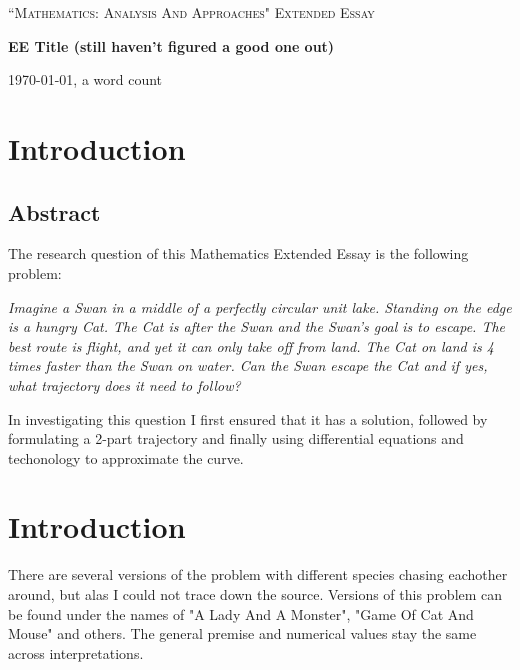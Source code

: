 \documentclass[12pt]{article}
\begin{document}
\begin{titlepage}
	\centering
	\vspace{1cm}
	{\Large \textsc{``Mathematics: Analysis And Approaches" Extended Essay}\par}
	\vspace{1.5cm}
	{\huge\bfseries EE Title (still haven't figured a good one out)\par}
	\vspace{2cm}
	\vfill
	\vfill
	{\large \today, a word count\par}
\end{titlepage}

\clearpage
{}
\tableofcontents
\newpage


\section{Introduction}
\subsection{Abstract}
The research question of this Mathematics Extended Essay is the following problem:

\emph{Imagine a Swan in a middle of a perfectly circular unit lake. Standing on the edge is a hungry Cat. The Cat is after the Swan and the Swan's goal is to escape. The best route is flight, and yet it can only take off from land. The Cat on land is 4 times faster than the Swan on water. Can the Swan escape the Cat and if yes, what trajectory does it need to follow?}

In investigating this question I first ensured that it has a solution, followed by formulating a 2-part trajectory and finally using differential equations and techonology to approximate the curve.

\section{Introduction}
There are several versions of the problem with different species chasing eachother around, but alas I could not trace down the source. Versions of this problem can be found under the names of "A Lady And A Monster"\cite{ladyandmonster}, "Game Of Cat And Mouse"\cite{Catandmouse} and others. The general premise and numerical values stay the same across interpretations. 
\end{document}
